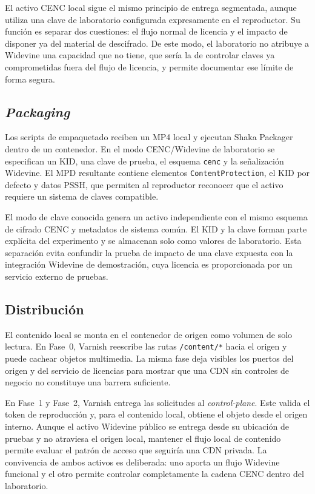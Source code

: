El activo CENC local sigue el mismo principio de entrega segmentada, aunque utiliza una clave de laboratorio configurada expresamente en el reproductor. Su función es separar dos cuestiones: el flujo normal de licencia y el impacto de disponer ya del material de descifrado. De este modo, el laboratorio no atribuye a Widevine una capacidad que no tiene, que sería la de controlar claves ya comprometidas fuera del flujo de licencia, y permite documentar ese límite de forma segura.

\subsection{\textit{Packaging}}

Los scripts de empaquetado reciben un MP4 local y ejecutan Shaka Packager dentro de un contenedor. En el modo CENC/Widevine de laboratorio se especifican un KID, una clave de prueba, el esquema \nolinkurl{cenc} y la señalización Widevine. El MPD resultante contiene elementos \nolinkurl{ContentProtection}, el KID por defecto y datos PSSH, que permiten al reproductor reconocer que el activo requiere un sistema de claves compatible.

El modo de clave conocida genera un activo independiente con el mismo esquema de cifrado CENC y metadatos de sistema común. El KID y la clave forman parte explícita del experimento y se almacenan solo como valores de laboratorio. Esta separación evita confundir la prueba de impacto de una clave expuesta con la integración Widevine de demostración, cuya licencia es proporcionada por un servicio externo de pruebas.

\subsection{Distribución}

El contenido local se monta en el contenedor de origen como volumen de solo lectura. En Fase~0, Varnish reescribe las rutas \nolinkurl{/content/*} hacia el origen y puede cachear objetos multimedia. La misma fase deja visibles los puertos del origen y del servicio de licencias para mostrar que una CDN sin controles de negocio no constituye una barrera suficiente.

En Fase~1 y Fase~2, Varnish entrega las solicitudes al \textit{control-plane}. Este valida el token de reproducción y, para el contenido local, obtiene el objeto desde el origen interno. Aunque el activo Widevine público se entrega desde su ubicación de pruebas y no atraviesa el origen local, mantener el flujo local de contenido permite evaluar el patrón de acceso que seguiría una CDN privada. La convivencia de ambos activos es deliberada: uno aporta un flujo Widevine funcional y el otro permite controlar completamente la cadena CENC dentro del laboratorio.

